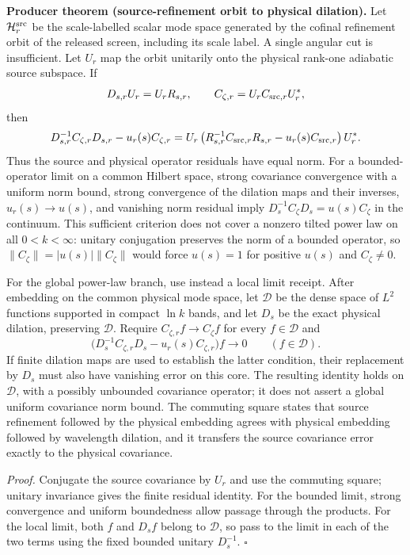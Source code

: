\textbf{Producer theorem (source-refinement orbit to physical dilation).}
\label{thm:oph330-source-orbit-transfer}
Let $\mathcal H^{\rm src}_r$ be the scale-labelled scalar mode space generated by
the cofinal refinement orbit of the released screen, including its scale label.
A single angular cut is insufficient. Let $U_r$ map the orbit unitarily onto the physical rank-one adiabatic source
subspace.  If
\[
 D_{s,r}U_r=U_rR_{s,r},\qquad
 C_{\zeta,r}=U_rC_{{\rm src},r}U_r^*,
\]
then
\[
 D_{s,r}^{-1}C_{\zeta,r}D_{s,r}-u_r(s)C_{\zeta,r}
 =U_r\left(R_{s,r}^{-1}C_{{\rm src},r}R_{s,r}
           -u_r(s)C_{{\rm src},r}\right)U_r^*.
\]
Thus the source and physical operator residuals have equal norm. For a
bounded-operator limit on a common Hilbert space, strong covariance convergence
with a uniform norm bound, strong convergence of the dilation maps and their
inverses, $u_r(s)\to u(s)$, and vanishing norm residual imply
$D_s^{-1}C_\zeta D_s=u(s)C_\zeta$ in the continuum.
This sufficient criterion does not cover a nonzero tilted power law on all
$0<k<\infty$: unitary conjugation preserves the norm of a bounded operator,
so $\|C_\zeta\|=|u(s)|\|C_\zeta\|$ would force $u(s)=1$ for positive $u(s)$
and $C_\zeta\ne0$.

For the global power-law branch, use instead a local limit receipt. After
embedding on the common physical mode space, let $\mathcal D$ be the dense
space of $L^2$ functions supported in compact $\ln k$ bands, and let $D_s$ be
the exact physical dilation, preserving $\mathcal D$. Require
$C_{\zeta,r}f\to C_\zeta f$ for every $f\in\mathcal D$ and
\[
 \bigl(D_s^{-1}C_{\zeta,r}D_s-u_r(s)C_{\zeta,r}\bigr)f\longrightarrow0
 \qquad(f\in\mathcal D).
\]
If finite dilation maps are used to establish the latter condition, their
replacement by $D_s$ must also have vanishing error on this core. The resulting
identity holds on $\mathcal D$, with a possibly unbounded covariance operator;
it does not assert a global uniform covariance norm bound.
The commuting square states that source refinement followed by the physical
embedding agrees with physical embedding followed by wavelength dilation, and
it transfers the source covariance error exactly to the physical covariance.

\textit{Proof.}
Conjugate the source covariance by $U_r$ and use the commuting square; unitary
invariance gives the finite residual identity. For the bounded limit, strong
convergence and uniform boundedness allow passage through the products. For
the local limit, both $f$ and $D_sf$ belong to $\mathcal D$, so pass to the
limit in each of the two terms using the fixed bounded unitary $D_s^{-1}$.
\hfill$\square$

